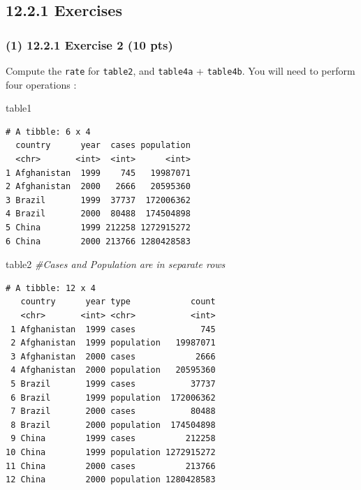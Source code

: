 \documentclass[
]{article}
\newenvironment{Shaded}{\begin{snugshade}}{\end{snugshade}}
\newcommand{\CommentTok}[1]{\textcolor[rgb]{0.56,0.35,0.01}{\textit{#1}}}
\newcommand{\NormalTok}[1]{#1}
\begin{document}
\hypertarget{exercises}{%
\subsection{12.2.1 Exercises}\label{exercises}}

\hypertarget{exercise-2-10-pts}{%
\subsubsection{(1) 12.2.1 Exercise 2 (10 pts)}\label{exercise-2-10-pts}}

Compute the \texttt{rate} for \texttt{table2}, and \texttt{table4a} +
\texttt{table4b}. You will need to perform four operations :

\begin{Shaded}
\begin{Highlighting}[]
\NormalTok{table1}
\end{Highlighting}
\end{Shaded}

\begin{verbatim}
# A tibble: 6 x 4
  country      year  cases population
  <chr>       <int>  <int>      <int>
1 Afghanistan  1999    745   19987071
2 Afghanistan  2000   2666   20595360
3 Brazil       1999  37737  172006362
4 Brazil       2000  80488  174504898
5 China        1999 212258 1272915272
6 China        2000 213766 1280428583
\end{verbatim}

\begin{Shaded}
\begin{Highlighting}[]
\NormalTok{table2 }\CommentTok{\#Cases and Population are in separate rows}
\end{Highlighting}
\end{Shaded}

\begin{verbatim}
# A tibble: 12 x 4
   country      year type            count
   <chr>       <int> <chr>           <int>
 1 Afghanistan  1999 cases             745
 2 Afghanistan  1999 population   19987071
 3 Afghanistan  2000 cases            2666
 4 Afghanistan  2000 population   20595360
 5 Brazil       1999 cases           37737
 6 Brazil       1999 population  172006362
 7 Brazil       2000 cases           80488
 8 Brazil       2000 population  174504898
 9 China        1999 cases          212258
10 China        1999 population 1272915272
11 China        2000 cases          213766
12 China        2000 population 1280428583
\end{verbatim}
\end{document}
